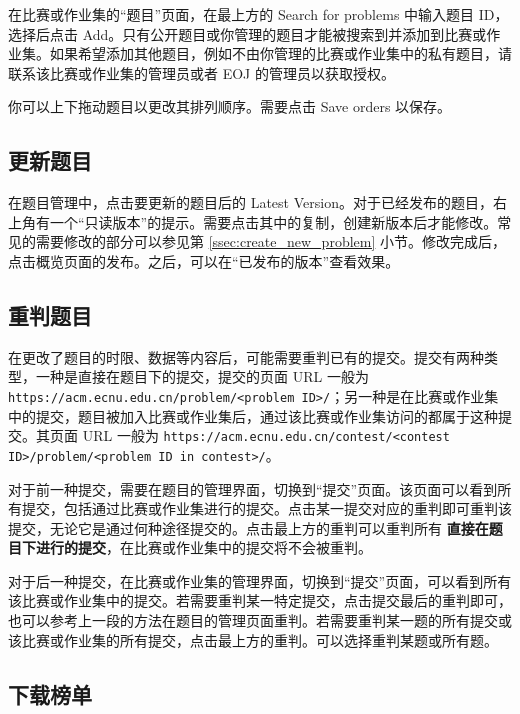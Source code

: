 \documentclass[oneside]{book}
\begin{document}
在比赛或作业集的``题目''页面，在最上方的 Search for problems 中输入题目 ID，选择后点击 Add。只有公开题目或你管理的题目才能被搜索到并添加到比赛或作业集。如果希望添加其他题目，例如不由你管理的比赛或作业集中的私有题目，请联系该比赛或作业集的管理员或者 EOJ 的管理员以获取授权。

你可以上下拖动题目以更改其排列顺序。需要点击 Save orders 以保存。

\subsection{更新题目}

\label{ssec:update_problem}

在题目管理中，点击要更新的题目后的 Latest Version。对于已经发布的题目，右上角有一个``只读版本''的提示。需要点击其中的复制，创建新版本后才能修改。常见的需要修改的部分可以参见第 \ref{ssec:create_new_problem} 小节。修改完成后，点击概览页面的发布。之后，可以在``已发布的版本''查看效果。

\subsection{重判题目}

\label{ssec:rejudge_problem}

在更改了题目的时限、数据等内容后，可能需要重判已有的提交。提交有两种类型，一种是直接在题目下的提交，提交的页面 URL 一般为 \lstinline|https://acm.ecnu.edu.cn/problem/<problem ID>/|；另一种是在比赛或作业集中的提交，题目被加入比赛或作业集后，通过该比赛或作业集访问的都属于这种提交。其页面 URL 一般为 \lstinline|https://acm.ecnu.edu.cn/contest/<contest ID>/problem/<problem ID in contest>/|。

对于前一种提交，需要在题目的管理界面，切换到``提交''页面。该页面可以看到所有提交，包括通过比赛或作业集进行的提交。点击某一提交对应的重判即可重判该提交，无论它是通过何种途径提交的。点击最上方的重判可以重判所有\textbf{\color{red} 直接在题目下进行的提交}，在比赛或作业集中的提交将不会被重判。

对于后一种提交，在比赛或作业集的管理界面，切换到``提交''页面，可以看到所有该比赛或作业集中的提交。若需要重判某一特定提交，点击提交最后的重判即可，也可以参考上一段的方法在题目的管理页面重判。若需要重判某一题的所有提交或该比赛或作业集的所有提交，点击最上方的重判。可以选择重判某题或所有题。

\subsection{下载榜单}
\end{document}
